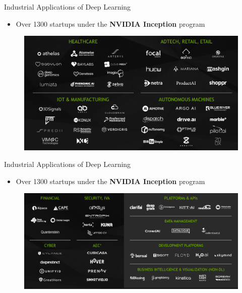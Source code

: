 \documentclass[10pt]{beamer}
\begin{document}
	\begin{frame}[t]{Industrial Applications of Deep Learning}
		\begin{itemize}
			\item \large{Over 1300 startups under the \textbf{NVIDIA Inception} program}
		\end{itemize}
		\begin{figure}
			\includegraphics[width=\linewidth]{images/startups1}
		\end{figure}
	\end{frame}	
	\begin{frame}[t]{Industrial Applications of Deep Learning}
		\begin{itemize}
			\item \large{Over 1300 startups under the \textbf{NVIDIA Inception} program}
		\end{itemize}
		\begin{figure}
			\includegraphics[width=\linewidth]{images/startups2}
		\end{figure}
	\end{frame}	
\end{document}
